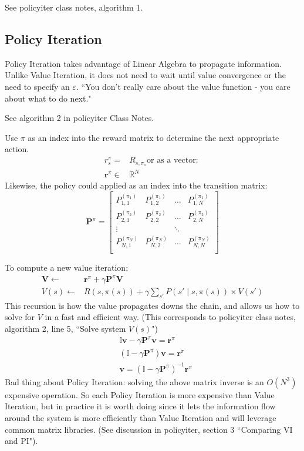 \documentclass[11pt, oneside]{article}   	%
\begin{document}
See policyiter class notes, algorithm 1.

\subsection{Policy Iteration}

Policy Iteration takes advantage of Linear Algebra to propagate information. Unlike Value Iteration, it does not need to wait until value convergence or the need to specify an $\varepsilon$. ``You don't really care about the value function - you care about what to do next."

See algorithm 2 in policyiter Class Notes.

Use $\pi$ as an index into the reward matrix to determine the next appropriate action.
\begin{align}
r_s^\pi = & R_{s,\pi_s}  \text{or as a vector:  } \\
\mathbf{r}^\pi \in & \mathbb{R}^N
\end{align}
Likewise, the policy could applied as an index into the transition matrix:
\begin{equation}
\mathbf{P}^\pi = \begin{bmatrix}
P_{1,1}^{(\pi_1)}  & P_{1,2}^{(\pi_1)} & \ldots & P_{1,N}^{(\pi_1)}\\[0.3em]
P_{2,1}^{(\pi_2)}  & P_{2,2}^{(\pi_2)} & \ldots & P_{2,N}^{(\pi_2)}\\[0.3em]
\vdots                   &                            & \ddots \\
P_{N,1}^{(\pi_N)}  & P_{N,2}^{(\pi_N)} & \ldots & P_{N,N}^{(\pi_N)}\\[0.3em]
\end{bmatrix}
\end{equation}

To compute a new value iteration:
\begin{align}
\mathbf{V} \leftarrow & \mathbf{r}^\pi + \gamma \mathbf{P}^\pi \mathbf{V}\\
V(s) \leftarrow  & R(s,\pi(s)) + \gamma \sum_{s'} P(s' \mid s, \pi(s)) \times V(s')
\end{align}
This recursion is how the value propagates downs the chain, and allows us how to solve for $V$ in a fast and efficient way.
(This corresponds to policyiter class notes, algorithm 2, line 5, ``Solve system $V(s)$")
\begin{align}
&\mathbb{I} \mathbf{v} - \gamma \mathbf{P}^\pi\mathbf{v} = \mathbf{r}^\pi \\
&(\mathbb{I} - \gamma \mathbf{P}^\pi)\mathbf{v} = \mathbf{r}^\pi \\
&\mathbf{v} =  (\mathbb{I} - \gamma \mathbf{P}^\pi)^{-1}\mathbf{r}^\pi
\end{align}
Bad thing about Policy Iteration: solving the above matrix inverse is an $O(N^3)$ expensive operation. So each Policy Iteration is more expensive than Value Iteration, but in practice it is worth doing since it lets the information flow around the system is more efficiently than Value Iteration and will leverage common matrix libraries. (See discussion in policyiter, section 3 ``Comparing VI and PI").
\end{document}
